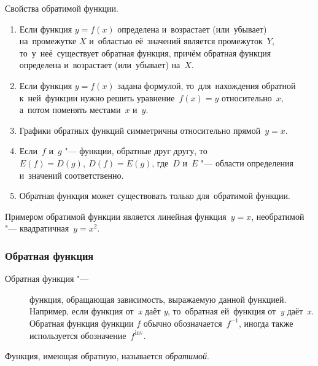 \documentclass[]{scrartcl}
\begin{document}
Свойства обратимой функции.
\begin{enumerate}
	\item Если функция ${\displaystyle y=f(x)}$ определена и~возрастает (или~убывает) на~промежутке ${\displaystyle X}$ и~областью её~значений является промежуток~${\displaystyle Y}$, то~у~неё~существует обратная функция, причём обратная функция определена и~возрастает (или~убывает) на~${\displaystyle X}$.
	\item Если функция ${\displaystyle y=f(x)}$ задана формулой, то~для~нахождения обратной к~ней~функции нужно решить уравнение~${\displaystyle f(x)=y}$ относительно~${\displaystyle x}$, а~потом поменять местами~${\displaystyle x}$ и~${\displaystyle y}$.
	\item Графики обратных функций симметричны относительно прямой~${\displaystyle y=x}$.
	\item Если~${\displaystyle f}$ и~${\displaystyle g}$ "--- функции, обратные друг другу, то~${\displaystyle E(f)=D(g),\ D(f)=E(g)}$, где~${\displaystyle D}$ и~${\displaystyle E}$ "--- области определения и~значений соответственно.
	\item Обратная функция может существовать только для~обратимой функции.
\end{enumerate}
Примером обратимой функции является линейная функция~${\displaystyle y=x}$, необратимой "--- квадратичная~${\displaystyle y=x^{2}}$.  
%
\subsubsection{Обратная функция}
\begin{description}
	\item[Обратная функция "---] функция, обращающая зависимость, выражаемую данной функцией. Например, если функция от~\textit{x} даёт \textit{y}, то~обратная ей~функция от~\textit{y} даёт~\textit{x}. Обратная функция функции ${\displaystyle f}$ обычно обозначается~${\displaystyle f^{-1}}$, иногда также используется обозначение~${\displaystyle f^{\mathrm {inv} }}$.
\end{description}
Функция, имеющая обратную, называется \emph{обратимой}. 
\end{document}
